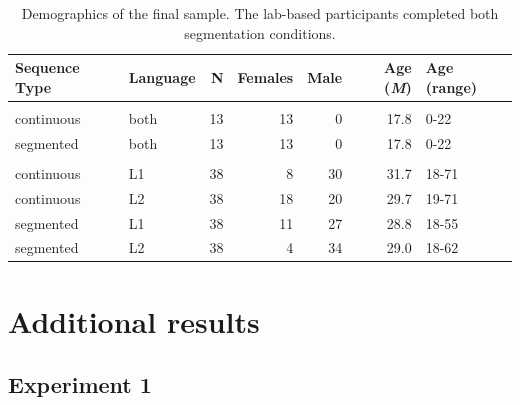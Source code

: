 \documentclass[]{article}
\newcommand{\M}{{\em M\/}}
\newcommand{\appsection}[1]{
  \clearpage
  \section{#1}
  \setcounter{subsection}{0}%
}
\begin{document}
\begin{table}

\caption{\label{tab:recall-final-demographics-print}Demographics of the final sample. The lab-based participants completed both segmentation conditions.}
\centering
\begin{tabular}[t]{llrrrrl}
\toprule
Sequence Type & Language & N & Females & Male & Age (\M) & Age (range)\\
\midrule
\addlinespace[0.3em]
\multicolumn{7}{l}{\textbf{Lab-based}}\\
\hspace{1em}continuous & both & 13 & 13 & 0 & 17.8 & 0-22\\
\hspace{1em}segmented & both & 13 & 13 & 0 & 17.8 & 0-22\\
\addlinespace[0.3em]
\multicolumn{7}{l}{\textbf{Online}}\\
\hspace{1em}continuous & L1 & 38 & 8 & 30 & 31.7 & 18-71\\
\hspace{1em}continuous & L2 & 38 & 18 & 20 & 29.7 & 19-71\\
\hspace{1em}segmented & L1 & 38 & 11 & 27 & 28.8 & 18-55\\
\hspace{1em}segmented & L2 & 38 & 4 & 34 & 29.0 & 18-62\\
\bottomrule
\end{tabular}
\end{table}

\clearpage

\appsection{Additional results}
\subsection{Experiment 1}
\end{document}

